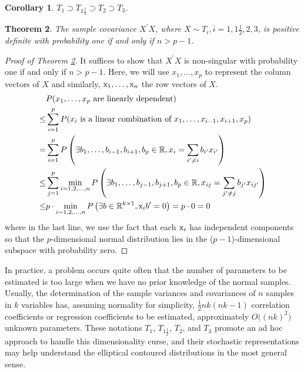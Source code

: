\documentclass{amsart}
\newtheorem{theorem}{Theorem}[section]
\newtheorem{corollary}[theorem]{Corollary}
\theoremstyle{definition}
\numberwithin{equation}{section}
\begin{document}
\begin{corollary}\label{prop: nested precision form 3}
$T_{1}\supset T_{1\frac{1}{2}} \supset T_{2} \supset T_{3}$. 
\end{corollary}

\begin{theorem} %
The sample covariance $ X^{\prime} X$, where $ X \sim T_{i}, i=1, 1\frac{1}{2}, 2, 3$, is positive definite with probability one if and only if $n  > p -1 $.
    \label{lem: dykstral70}
\end{theorem}



\begin{proof}[Proof of Theorem \ref{lem: dykstral70}] 
    It suffices to show that ${X}^{\prime}{X}$ is non-singular with probability one if and only if $n> p -1$. Here, we will use ${x}_{1}, \dots, {x}_{p}$ to represent the column vectors of $X$ and similarly, ${\rm x}_{1}, \dots, {\rm x}_{n}$ the row vectors of $X$. 
	 \[\begin{aligned}	 	& {P} ({x}_{1}, \dots, {x}_{p} \text{ are linearly dependent})\\	 \leq &\sum_{i=1}^{p}{P} ({x}_{i} \text{ is a linear combination of }{x}_{1}, \dots, {x}_{i-1}, {x}_{i+1},{x}_{p})\\
     = & \sum_{i=1}^{p}{P} \left(\exists {b}_{1}, \dots, {b}_{i-1}, {b}_{i+1},{b}_{p} \in \mathbb R, {x}_{i}= \sum_{i^{\prime} \neq i}b_{i^{\prime}}x_{i^{\prime}}\right)\\
     \leq &  \sum_{j=1}^{p} \min_{i=1,2,\dots, n} {P} \left(\exists  {b}_{1}, \dots, {b}_{j-1}, {b}_{j+1},{b}_{p} \in \mathbb R, {x}_{ij}= \sum_{j^{\prime} \neq j}b_{j^{\prime}}x_{ij^{\prime}}\right)\\
     \leq &  p\cdot \min_{i=1,2,\dots, n} {P} \left(\exists b  \in \mathbb R^{k\times 1}, {\rm x}_{i} {b}^{\prime} = 0\right)= p \cdot 0 = 0\end{aligned} \]
    where in the last line, we use the fact that each ${\rm x}_{i}$ has independent components so that the $p$-dimensional normal distribution lies in the ($p-1$)-dimensional subspace with probability zero. 
\end{proof}

In practice, a problem occurs quite often that the number of parameters to be estimated is too large when we have no prior knowledge of the normal samples. Usually, the determination of the sample variances and covariances of $n$ samples in $k$ variables has, assuming normality for simplicity, $\frac{1}{2}nk(nk-1)$ correlation coefficients or regression coefficients to be estimated, approximately $O\big((nk)^2\big)$ unknown parameters. These notations $T_{1}$, $T_{1\frac{1}{2}}$, $T_{2}$, and $T_{3}$ promote an ad hoc approach to handle this dimensionality curse, and their stochastic representations may help understand the elliptical contoured distributions in the most general sense. 
\end{document}
